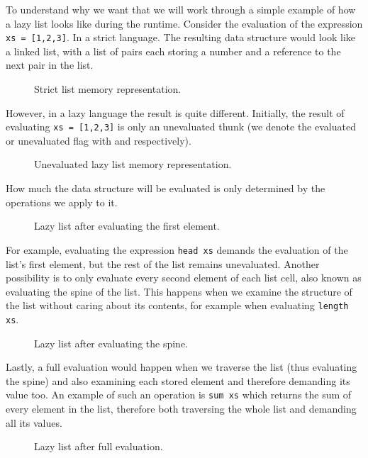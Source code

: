 \documentclass[sigconf]{acmart}
\newcommand{\green}[1]{\color{green}\color{.!80!black}{#1}}
\newcommand{\red}[1]{\color{red}{#1}}
\newcommand{\hsinl}[1]{\texttt{#1}}
\newcommand{\code}[1]{\texttt{#1}}
\begin{document}
To understand why we want that we will work through a simple example of how a
lazy list looks like during the runtime. Consider the evaluation of the
expression \hsinl{xs = [1,2,3]}. In a strict language. The resulting data
structure would look like a linked list, with a list of pairs each storing a
number and a reference to the next pair in the list.
\begin{figure}[h]
  \centering
  
  \caption{Strict list memory representation.}
\end{figure}
However, in a lazy language the result is quite different. Initially, the result
of evaluating \hsinl{xs = [1,2,3]} is only an unevaluated thunk (we denote the
evaluated or unevaluated flag with {\green{\code{E}}} and {\red{\code{NE}}}
respectively).
\begin{figure}[h]
  \centering
  
  \caption{Unevaluated lazy list memory representation.}
\end{figure}
How much the data structure will be evaluated is only determined by the
operations we apply to it.
\begin{figure}[h]
  \centering
  
  \caption{Lazy list after evaluating the first element.}
\end{figure}
For example, evaluating the expression \hsinl{head xs} demands the evaluation of
the list's first element, but the rest of the list remains unevaluated. Another
possibility is to only evaluate every second element of each list cell, also
known as evaluating the spine of the list. This happens when we examine the
structure of the list without caring about its contents, for example when
evaluating \hsinl{length xs}.
\begin{figure}[h]
  \centering
  
  \caption{Lazy list after evaluating the spine.}
\end{figure}
Lastly, a full evaluation would happen when we traverse the list (thus
evaluating the spine) and also examining each stored element and therefore
demanding its value too. An example of such an operation is \hsinl{sum xs} which
returns the sum of every element in the list, therefore both traversing the
whole list and demanding all its values.
\begin{figure}[h]
  \centering
  
  \caption{Lazy list after full evaluation.}
\end{figure}
\end{document}
